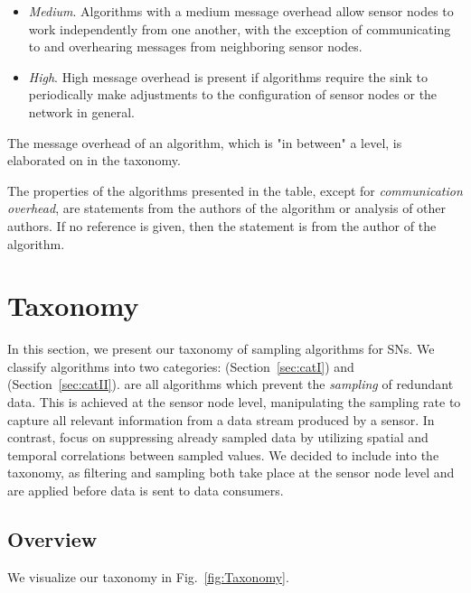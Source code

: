 \begin{description}
\begin{itemize}
            \item \textit{Medium}. Algorithms with a medium message overhead
            allow sensor nodes to work independently from one another, with the
            exception of communicating to and overhearing messages from
            neighboring sensor nodes.

            \item \textit{High}. High message overhead is present if
            algorithms require the sink to periodically make adjustments to
            the configuration of sensor nodes or the network in general.
        \end{itemize}

        The message overhead of an algorithm, which is "in between" a level, is
        elaborated on in the taxonomy.

        The properties of the algorithms presented in the table, except for
        \textit{communication overhead}, are statements from the authors of the
        algorithm or analysis of other authors. If no reference is given, then
        the statement is from the author of the algorithm.

\end{description}


\section{Taxonomy}
\label{sec:Taxonomy}

In this section, we present our taxonomy of sampling algorithms for \acp{SN}.
We classify algorithms into two categories: \catI (Section~\ref{sec:catI}) and
\catII (Section~\ref{sec:catII}). \catI are all algorithms which prevent the
\textit{sampling} of redundant data. This is achieved at the sensor node level,
manipulating the sampling rate to capture all relevant information from a data
stream produced by a sensor. In contrast, \catII focus on suppressing already
sampled data by utilizing spatial and temporal correlations between sampled
values. We decided to include \catII into the taxonomy, as filtering and
sampling both take place at the sensor node level and are applied before data
is sent to data consumers.

\subsection{Overview}
\label{sec:Overview}

We visualize our taxonomy in Fig.~\ref{fig:Taxonomy}.

